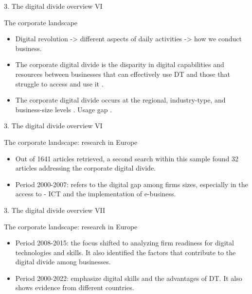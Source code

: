 \documentclass[
  ignorenonframetext,
]{beamer}
\providecommand{\tightlist}{%
  \setlength{\itemsep}{0pt}\setlength{\parskip}{0pt}}
\begin{document}
\begin{frame}{3. The digital divide overview VI}
\protect\hypertarget{the-digital-divide-overview-vi}{}
\begin{block}{The corporate landscape}
\protect\hypertarget{the-corporate-landscape}{}
\begin{itemize}
\tightlist
\item
  Digital revolution -\textgreater{} different aspects of daily
  activities -\textgreater{} how we conduct business.
\item
  The corporate digital divide is the disparity in digital capabilities
  and resources between businesses that can effectively use DT and those
  that struggle to access and use it \citep{shakina2021}.
\item
  The corporate digital divide occurs at the regional, industry-type,
  and business-size levels \citep{pejicbach2013}. Usage gap
  \citep{pliskin2006}.
\end{itemize}
\end{block}
\end{frame}

\begin{frame}{3. The digital divide overview VI}
\protect\hypertarget{the-digital-divide-overview-vi-1}{}
\begin{block}{The corporate landscape: research in Europe}
\protect\hypertarget{the-corporate-landscape-research-in-europe}{}
\begin{itemize}
\tightlist
\item
  Out of 1641 articles retrieved, a second search within this sample
  found 32 articles addressing the corporate digital divide.
\item
  Period 2000-2007: refers to the digital gap among firms sizes,
  especially in the access to - ICT and the implementation of
  e-business.
\end{itemize}
\end{block}
\end{frame}

\begin{frame}{3. The digital divide overview VII}
\protect\hypertarget{the-digital-divide-overview-vii}{}
\begin{block}{The corporate landscape: research in Europe}
\protect\hypertarget{the-corporate-landscape-research-in-europe-1}{}
\begin{itemize}
\tightlist
\item
  Period 2008-2015: the focus shifted to analyzing firm readiness for
  digital technologies and skills. It also identified the factors that
  contribute to the digital divide among businesses.
\item
  Period 2000-2022: emphasize digital skills and the advantages of DT.
  It also shows evidence from different countries.
\end{itemize}
\end{block}
\end{frame}
\end{document}

